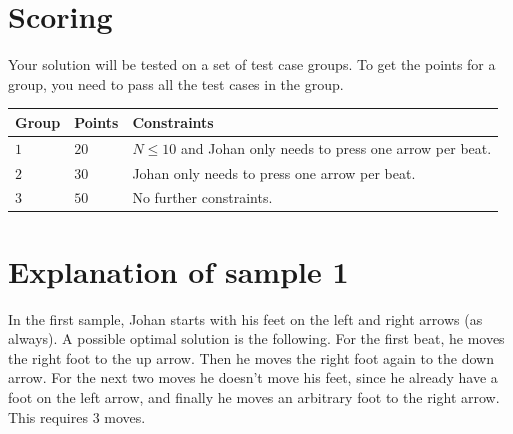 \section*{Scoring}
Your solution will be tested on a set of test case groups.
To get the points for a group, you need to pass all the test cases in the group.

\noindent
\begin{tabular}{| l | l | p{10cm} |}
\hline
Group & Points & Constraints \\ \hline
  $1$    & $20$        & $N \le 10$ and Johan only needs to press one arrow per beat. \\ \hline 
  $2$    & $30$        & Johan only needs to press one arrow per beat. \\ \hline
  $3$    & $50$        & No further constraints. \\ \hline 
\end{tabular}

\section*{Explanation of sample 1}
In the first sample, Johan starts with his feet on the left and right arrows (as always).
A possible optimal solution is the following.
For the first beat, he moves the right foot to the up arrow.
Then he moves the right foot again to the down arrow.
For the next two moves he doesn't move his feet, since he already have a foot on the left arrow, and finally he moves an arbitrary foot to the right arrow.
This requires $3$ moves.
